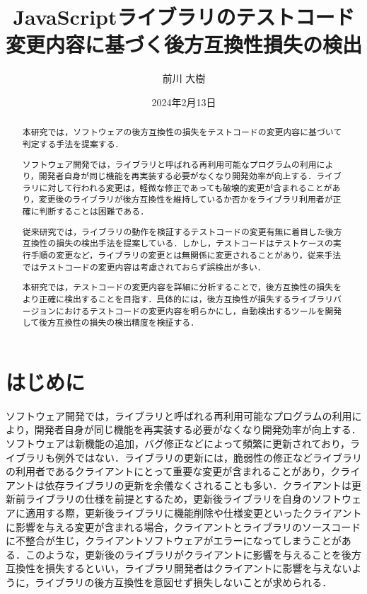 \documentclass[11pt,dvipdfmx]{jreport}
\title{JavaScriptライブラリのテストコード変更内容に基づく後方互換性損失の検出}
\author{前川 大樹}
\date{2024年2月13日}	%
\begin{document}
\maketitle

\begin{abstract}
本研究では，ソフトウェアの後方互換性の損失をテストコードの変更内容に基づいて判定する手法を提案する．

ソフトウェア開発では，ライブラリと呼ばれる再利用可能なプログラムの利用により，開発者自身が同じ機能を再実装する必要がなくなり開発効率が向上する．ライブラリに対して行われる変更は，軽微な修正であっても破壊的変更が含まれることがあり，変更後のライブラリが後方互換性を維持しているか否かをライブラリ利用者が正確に判断することは困難である．

従来研究では，ライブラリの動作を検証するテストコードの変更有無に着目した後方互換性の損失の検出手法を提案している．しかし，テストコードはテストケースの実行手順の変更など，ライブラリの変更とは無関係に変更されることがあり，従来手法ではテストコードの変更内容は考慮されておらず誤検出が多い．

本研究では，テストコードの変更内容を詳細に分析することで，後方互換性の損失をより正確に検出することを目指す．具体的には，後方互換性が損失するライブラリバージョンにおけるテストコードの変更内容を明らかにし，自動検出するツールを開発して後方互換性の損失の検出精度を検証する．

\end{abstract}

\tableofcontents



\newpage
{}	%



\chapter{はじめに}
ソフトウェア開発では，ライブラリと呼ばれる再利用可能なプログラムの利用により，開発者自身が同じ機能を再実装する必要がなくなり開発効率が向上する\cite{shared-software}\cite{effect-on-developer}．ソフトウェアは新機能の追加，バグ修正などによって頻繁に更新されており，ライブラリも例外ではない\cite{library-analysis}．ライブラリの更新には，脆弱性の修正などライブラリの利用者であるクライアントにとって重要な変更が含まれることがあり，クライアントは依存ライブラリの更新を余儀なくされることも多い．クライアントは更新前ライブラリの仕様を前提とするため，更新後ライブラリを自身のソフトウェアに適用する際，更新後ライブラリに機能削除や仕様変更といったクライアントに影響を与える変更が含まれる場合，クライアントとライブラリのソースコードに不整合が生じ，クライアントソフトウェアがエラーになってしまうことがある．このような，更新後のライブラリがクライアントに影響を与えることを後方互換性を損失するといい，ライブラリ開発者はクライアントに影響を与えないように，ライブラリの後方互換性を意図せず損失しないことが求められる．
\end{document}
